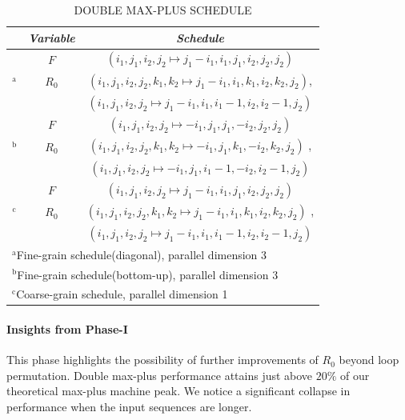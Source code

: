 \begin{table}[htbp]
\caption{\uppercase{Double max-plus schedule}}
\begin{center}
\begin{tabular}{|c|c|c|}
\hline
\textbf{} & \textbf{\textit{Variable}}& \textbf{\textit{Schedule}} \\
\hline
  & $F$ & $(i_{1},j_{1},i_{2},j_{2} \mapsto j_{1}-i_{1},i_{1},j_{1},i_{2},j_{2},j_{2})$   \\
\cline{2-3} 
$^{\mathrm{a}}$ & $R_{0}$ & $(i_{1},j_{1},i_{2},j_{2},k_{1},k_{2} \mapsto j_{1}-i_{1},i_{1},k_{1},i_{2},k_{2},j_{2})$,    \\
 & & $(i_{1},j_{1},i_{2},j_{2} \mapsto j_{1}-i_{1},i_{1},i_{1}-1,i_{2},i_{2}-1,j_{2})$ \\
\hline
  & $F$ & $(i_{1}, j_{1}, i_{2}, j_{2} \mapsto -i_{1}, j_{1}, j_{1}, -i_{2}, j_{2}, j_{2})$  \\
\cline{2-3} 
$^{\mathrm{b}}$ & $R_{0}$& $(i_{1},j_{1},i_{2},j_{2},k_{1},k_{2} \mapsto -i_{1},j_{1},k_{1},-i_{2},k_{2},j_{2})$ ,   \\
 & & $(i_{1},j_{1},i_{2},j_{2} \mapsto -i_{1},j_{1},i_{1}-1,-i_{2},i_{2}-1,j_{2})$ \\
\hline
  & $F$ & $(i_{1}, j_{1}, i_{2}, j_{2} \mapsto  j_{1}-i_{1}, i_{1}, j_{1}, i_{2}, j_{2}, j_{2})$   \\
\cline{2-3} 
$^{\mathrm{c}}$ & $R_{0}$& $(i_{1},j_{1},i_{2},j_{2},k_{1},k_{2} \mapsto j_{1}-i_{1},i_{1},k_{1},i_{2},k_{2},j_{2})$ ,   \\
 & & $(i_{1},j_{1},i_{2},j_{2} \mapsto j_{1}-i_{1},i_{1},i_{1}-1,i_{2},i_{2}-1,j_{2})$ \\
\hline
\multicolumn{3}{l}{$^{\mathrm{a}}$Fine-grain schedule(diagonal), parallel dimension 3}\\
\multicolumn{3}{l}{$^{\mathrm{b}}$Fine-grain schedule(bottom-up), parallel dimension 3}\\
\multicolumn{3}{l}{$^{\mathrm{c}}$Coarse-grain schedule, parallel dimension 1}
\end{tabular}
\label{tab1:double_max_plus_schedule}
\end{center}
\end{table}


\paragraph{Insights from Phase-I}
This phase highlights the possibility of further improvements of $R_{0}$ beyond loop permutation. Double max-plus performance attains just above  $20\%$ of our theoretical max-plus machine peak. We notice a significant collapse in performance when the input sequences are longer.
 
